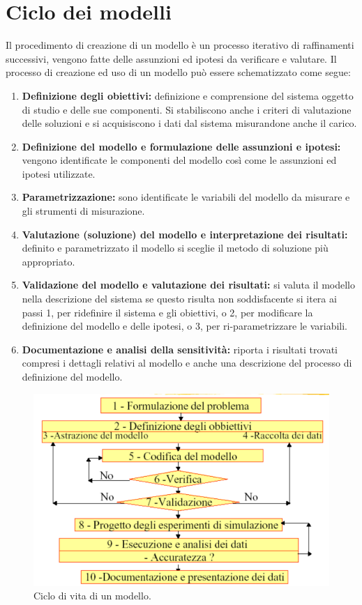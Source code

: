  
 
\section{Ciclo dei modelli}
Il procedimento di creazione di un modello è un processo iterativo di raffinamenti successivi, vengono fatte delle assunzioni ed ipotesi da verificare e valutare.
Il processo di creazione ed uso di un modello può essere schematizzato come segue:
\begin{enumerate}
    \item \textbf{Definizione degli obiettivi:} definizione e comprensione del sistema oggetto di studio e delle sue componenti. Si stabiliscono anche i criteri di valutazione delle soluzioni e si acquisiscono i dati dal sistema misurandone anche il carico.
    \item \textbf{Definizione del modello e formulazione delle assunzioni e ipotesi:} vengono identificate le componenti del modello così come le assunzioni ed ipotesi utilizzate.
    \item \textbf{Parametrizzazione:} sono identificate le variabili del modello da misurare e gli strumenti di misurazione.
    \item \textbf{Valutazione (soluzione) del modello e interpretazione dei risultati:} definito e parametrizzato il modello si sceglie il metodo di soluzione più appropriato.
    \item \textbf{Validazione del modello e valutazione dei risultati:} si valuta il modello nella descrizione del sistema se questo risulta non soddisfacente si itera ai passi 1, per ridefinire il sistema e gli obiettivi, o 2, per modificare la definizione del modello e delle ipotesi, o 3, per ri-parametrizzare le variabili.
    \item \textbf{Documentazione e analisi della sensitività:} riporta i risultati trovati compresi i dettagli relativi al modello e anche una descrizione del processo di definizione del modello.
\end{enumerate}

\begin{figure}[H]
	\centering
    \includegraphics[width=15cm, keepaspectratio]{img/ciclo_modello.png}
	\caption{Ciclo di vita di un modello.}\label{fig:ciclo_modello}
\end{figure}


